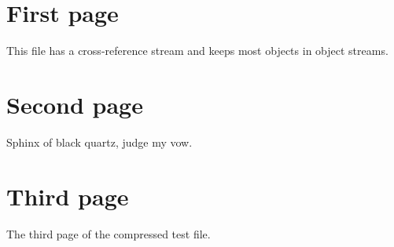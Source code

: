 \documentclass[a4paper]{article}
\begin{document}
\section{First page}
This file has a cross-reference stream and keeps most objects in object streams.
\newpage
\section{Second page}
Sphinx of black quartz, judge my vow.
\newpage
\section{Third page}
The third page of the compressed test file.
\end{document}
